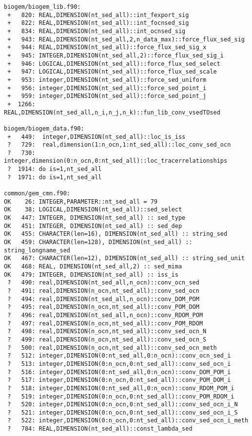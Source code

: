 \documentclass[a4paper,10pt,article]{memoir}
\begin{document}
\begin{small}
\begin{verbatim}
biogem/biogem_lib.f90:
 +   820: REAL,DIMENSION(nt_sed_all)::int_fexport_sig
 +   822: REAL,DIMENSION(nt_sed_all)::int_focnsed_sig
 +   834: REAL,DIMENSION(nt_sed_all)::int_ocnsed_sig
 +   943: REAL,DIMENSION(nt_sed_all,2,n_data_max)::force_flux_sed_sig
 +   944: REAL,DIMENSION(nt_sed_all)::force_flux_sed_sig_x
 +   945: INTEGER,DIMENSION(nt_sed_all,2)::force_flux_sed_sig_i
 +   946: LOGICAL,DIMENSION(nt_sed_all)::force_flux_sed_select
 +   947: LOGICAL,DIMENSION(nt_sed_all)::force_flux_sed_scale
 +   953: integer,DIMENSION(nt_sed_all)::force_sed_uniform
 +   956: integer,DIMENSION(nt_sed_all)::force_sed_point_i
 +   959: integer,DIMENSION(nt_sed_all)::force_sed_point_j
 +  1266: REAL,DIMENSION(nt_sed_all,n_i,n_j,n_k)::fun_lib_conv_vsedTOsed

biogem/biogem_data.f90:
 +   449:  integer,DIMENSION(nt_sed_all)::loc_is_iss
 ?   729:  real,dimension(1:n_ocn,1:nt_sed_all)::loc_conv_sed_ocn
 ?   730:  integer,dimension(0:n_ocn,0:nt_sed_all)::loc_tracerrelationships
 ?  1914: do is=1,nt_sed_all
 ?  1971: do is=1,nt_sed_all

common/gem_cmn.f90:
OK    26: INTEGER,PARAMETER::nt_sed_all = 79
OK    38: LOGICAL,DIMENSION(nt_sed_all)::sed_select
OK   447: INTEGER, DIMENSION(nt_sed_all) :: sed_type
OK   451: INTEGER, DIMENSION(nt_sed_all) :: sed_dep
OK   455: CHARACTER(len=16), DIMENSION(nt_sed_all) :: string_sed
OK   459: CHARACTER(len=128), DIMENSION(nt_sed_all) :: string_longname_sed
OK   467: CHARACTER(len=12), DIMENSION(nt_sed_all) :: string_sed_unit
OK   468: REAL, DIMENSION(nt_sed_all,2) :: sed_mima
OK   479: INTEGER, DIMENSION(nt_sed_all) :: iss_is
 ?   490: real,DIMENSION(nt_sed_all,n_ocn)::conv_ocn_sed
 ?   491: real,DIMENSION(n_ocn,nt_sed_all)::conv_sed_ocn
 ?   494: real,DIMENSION(nt_sed_all,n_ocn)::conv_DOM_POM
 ?   495: real,DIMENSION(n_ocn,nt_sed_all)::conv_POM_DOM
 ?   496: real,DIMENSION(nt_sed_all,n_ocn)::conv_RDOM_POM
 ?   497: real,DIMENSION(n_ocn,nt_sed_all)::conv_POM_RDOM
 ?   498: real,DIMENSION(n_ocn,nt_sed_all)::conv_sed_ocn_N
 ?   499: real,DIMENSION(n_ocn,nt_sed_all)::conv_sed_ocn_S
 ?   500: real,DIMENSION(n_ocn,nt_sed_all)::conv_sed_ocn_meth
 ?   512: integer,DIMENSION(0:nt_sed_all,0:n_ocn)::conv_ocn_sed_i
 ?   513: integer,DIMENSION(0:n_ocn,0:nt_sed_all)::conv_sed_ocn_i
 ?   516: integer,DIMENSION(0:nt_sed_all,0:n_ocn)::conv_DOM_POM_i
 ?   517: integer,DIMENSION(0:n_ocn,0:nt_sed_all)::conv_POM_DOM_i
 ?   518: integer,DIMENSION(0:nt_sed_all,0:n_ocn)::conv_RDOM_POM_i
 ?   519: integer,DIMENSION(0:n_ocn,0:nt_sed_all)::conv_POM_RDOM_i
 ?   520: integer,DIMENSION(0:n_ocn,0:nt_sed_all)::conv_sed_ocn_i_N
 ?   521: integer,DIMENSION(0:n_ocn,0:nt_sed_all)::conv_sed_ocn_i_S
 ?   522: integer,DIMENSION(0:n_ocn,0:nt_sed_all)::conv_sed_ocn_i_meth
 ?   784: REAL,DIMENSION(nt_sed_all)::const_lambda_sed


\end{verbatim}
\end{small}
\end{document}
